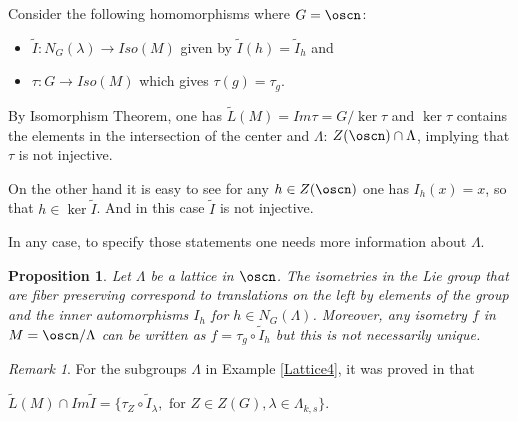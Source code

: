\documentclass[12pt]{amsart}
\theoremstyle{plain}
\newtheorem{prop}[thm]{Proposition}
\theoremstyle{definition}
\theoremstyle{remark}
\newtheorem{rem}{Remark}
\begin{document}
Consider the following homomorphisms where $G=\oscn$:
\begin{itemize}
	\item $\widetilde{I}:N_G(\lambda) \to Iso(M)$ given by $\widetilde{I}(h)=\widetilde{I}_h$ and
	\item $\tau: G \to Iso(M)$ which gives $\tau(g)=\tau_g$.
\end{itemize}

By Isomorphism Theorem, one has $\tilde{L}(M)=Im\tau=G/\ker\tau$ and $\ker\tau$ contains the elements in the intersection of the center and $\Lambda$: $Z(\oscn)\cap \Lambda$, implying that $\tau$ is not injective. 

On the other hand it is easy to see for any $h\in Z(\oscn)$ one has $I_h(x)=x$, so that $h\in \ker \widetilde{I}$. And in this case $\widetilde{I}$ is not injective. 

In any case, to specify those statements one needs more information about $\Lambda$. 


\begin{prop}
 Let $\Lambda$ be a lattice in $\oscn$. The isometries in the Lie group that are fiber preserving correspond to translations on the left by elements of the group and the inner automorphisms $I_h$ for $h\in N_G(\Lambda)$. Moreover, 
 any isometry $f$ in $M=\oscn/\Lambda$ can be written as $f=\tau_g\circ \widetilde{I}_h$ but this  is not necessarily unique. 
\end{prop}

\begin{rem} For the subgroups $\Lambda$ in Example \ref{Lattice4}, it was proved in \cite{BOV}  that 
	
	$\tilde{L}(M)\cap Im \tilde{I}=\{\tau_Z\circ\widetilde{I}_{\lambda}, \mbox{ for } Z\in Z(G), \lambda\in \Lambda_{k,s}\}$. 
	\end{rem}
	
\end{document}
